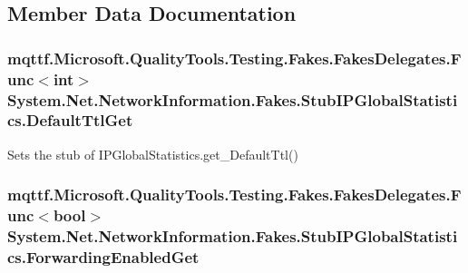 \subsection{Member Data Documentation}
\hypertarget{class_system_1_1_net_1_1_network_information_1_1_fakes_1_1_stub_i_p_global_statistics_a3f652754365a9ef5ee09ce79eb4de805}{
\subsubsection[{Default\-Ttl\-Get}]{\setlength{\rightskip}{0pt plus 5cm}mqttf.\-Microsoft.\-Quality\-Tools.\-Testing.\-Fakes.\-Fakes\-Delegates.\-Func$<$int$>$ System.\-Net.\-Network\-Information.\-Fakes.\-Stub\-I\-P\-Global\-Statistics.\-Default\-Ttl\-Get}}\label{class_system_1_1_net_1_1_network_information_1_1_fakes_1_1_stub_i_p_global_statistics_a3f652754365a9ef5ee09ce79eb4de805}


Sets the stub of I\-P\-Global\-Statistics.\-get\-\_\-\-Default\-Ttl()

\hypertarget{class_system_1_1_net_1_1_network_information_1_1_fakes_1_1_stub_i_p_global_statistics_acf5872283ba7021a46fd6ee3375a79f0}{
\subsubsection[{Forwarding\-Enabled\-Get}]{\setlength{\rightskip}{0pt plus 5cm}mqttf.\-Microsoft.\-Quality\-Tools.\-Testing.\-Fakes.\-Fakes\-Delegates.\-Func$<$bool$>$ System.\-Net.\-Network\-Information.\-Fakes.\-Stub\-I\-P\-Global\-Statistics.\-Forwarding\-Enabled\-Get}}\label{class_system_1_1_net_1_1_network_information_1_1_fakes_1_1_stub_i_p_global_statistics_acf5872283ba7021a46fd6ee3375a79f0}


